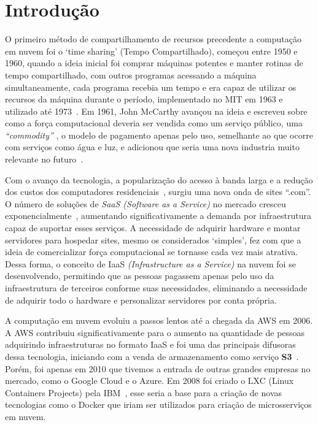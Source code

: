 \chapter{Introdução}
\label{chp:introduction}

O primeiro método de compartilhamento de recursos precedente a computação em nuvem foi o `time sharing' (Tempo Compartilhado), começou entre 1950 e 1960, quando a ideia inicial foi comprar máquinas potentes e manter rotinas de tempo compartilhado, com outros programas acessando a máquina simultaneamente, cada programa recebia um tempo e era capaz de utilizar os recursos da máquina durante o período, implementado no MIT em 1963 e utilizado até 1973~\citep{HistoryOfCloudByIBM}. Em 1961, John McCarthy avançou na ideia e escreveu sobre como a força computacional deveria ser vendida como um serviço público, uma \textit{``commodity''} \citep[History Cloud]{arutyunov2012cloud}, o modelo de pagamento apenas pelo uso, semelhante ao que ocorre com serviços como água e luz, e adicionou que seria uma nova industria muito relevante no futuro~\citep{qian2009cloud}.

Com o avanço da tecnologia, a popularização do acesso à banda larga e a redução dos custos dos computadores residenciais~\citep{qian2009cloud}, surgiu uma nova onda de sites ``.com''. O número de soluções de \textit{SaaS (Software as a Service)} no mercado cresceu exponencialmente~\citep{InternetLiveWebsites}, aumentando significativamente a demanda por infraestrutura capaz de suportar esses serviços. A necessidade de adquirir hardware e montar servidores para hospedar sites, mesmo os considerados `simples', fez com que a ideia de comercializar força computacional se tornasse cada vez mais atrativa. Dessa forma, o conceito de IaaS \textit{(Infrastructure as a Service)} na nuvem foi se desenvolvendo, permitindo que as pessoas pagassem apenas pelo uso da infraestrutura de terceiros conforme suas necessidades, eliminando a necessidade de adquirir todo o hardware e personalizar servidores por conta própria.

A computação em nuvem evoluiu a passos lentos até a chegada da AWS em 2006. A AWS contribuiu significativamente para o aumento na quantidade de pessoas adquirindo infraestruturas no formato IaaS e foi uma das principais difusoras dessa tecnologia, iniciando com a venda de armazenamento como serviço \textbf{S3}~\citep{AWSlauch}. Porém, foi apenas em 2010 que tivemos a entrada de outras grandes empresas no mercado, como o Google Cloud e o Azure. Em 2008 foi criado o LXC (Linux Containers Projects) pela IBM~\citep{HistoryOfContainers}, esse seria a base para a criação de novas tecnologias como o Docker que iriam ser utilizados para criação de microsserviços em nuvem. 

